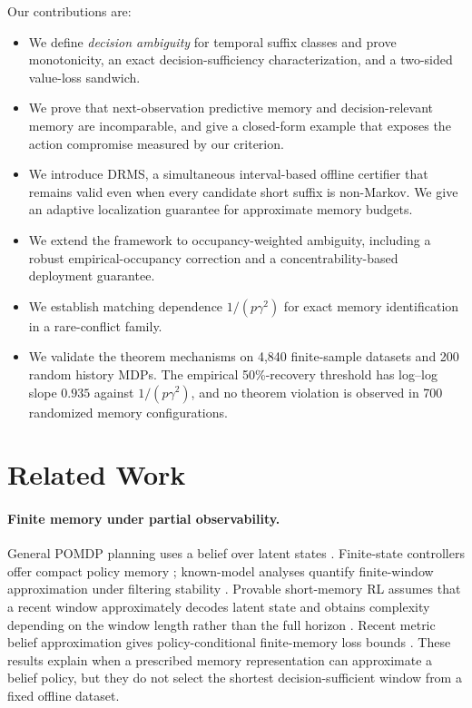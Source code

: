 \documentclass[letterpaper]{article} %
\theoremstyle{remark}
\newcommand{\DRMS}{\textnormal{\textsc{DRMS}}}
\begin{document}
Our contributions are:
\begin{itemize}
  \item We define \emph{decision ambiguity} for temporal suffix classes and
  prove monotonicity, an exact decision-sufficiency characterization, and a
  two-sided value-loss sandwich.
  \item We prove that next-observation predictive memory and
  decision-relevant memory are incomparable, and give a closed-form example
  that exposes the action compromise measured by our criterion.
  \item We introduce \DRMS, a simultaneous interval-based offline certifier
  that remains valid even when every candidate short suffix is non-Markov.
  We give an adaptive localization guarantee for approximate memory budgets.
  \item We extend the framework to occupancy-weighted ambiguity, including a
  robust empirical-occupancy correction and a concentrability-based deployment
  guarantee.
  \item We establish matching dependence $1/(p\gamma^2)$ for exact memory
  identification in a rare-conflict family.
  \item We validate the theorem mechanisms on 4,840 finite-sample datasets and
  200 random history MDPs. The empirical 50\%-recovery threshold has log--log
  slope $0.935$ against $1/(p\gamma^2)$, and no theorem violation is observed
  in 700 randomized memory configurations.
\end{itemize}

\section{Related Work}

\paragraph{Finite memory under partial observability.}
General POMDP planning uses a belief over latent states
\citep{kaelbling1998pomdp}. Finite-state controllers offer compact policy
memory \citep{amato2010mealy}; known-model analyses quantify finite-window
approximation under filtering stability \citep{kara2022finite}. Provable
short-memory RL assumes that a recent window approximately decodes latent
state and obtains complexity depending on the window length rather than the
full horizon \citep{efroni2022short}. Recent metric belief approximation gives
policy-conditional finite-memory loss bounds \citep{kim2026belief}. These
results explain when a prescribed memory representation can approximate a
belief policy, but they do not select the shortest decision-sufficient window
from a fixed offline dataset.
\end{document}
